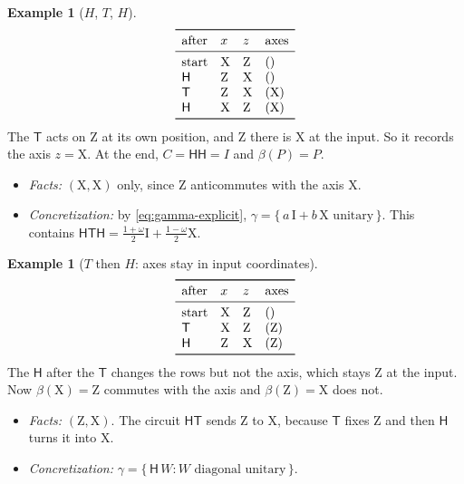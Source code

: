 \documentclass[11pt]{article}
\theoremstyle{definition}
\newtheorem{example}[theorem]{Example}
\theoremstyle{remark}
\newcommand{\gam}{\gamma}
\newcommand{\back}{\beta}
\newcommand{\tI}{\mathrm{I}}
\newcommand{\tX}{\mathrm{X}}
\newcommand{\tZ}{\mathrm{Z}}
\newcommand{\gate}[1]{\mathsf{#1}}
\begin{document}
\begin{example}[$H$, $T$, $H$]
\[
\begin{array}{llll}
\toprule
\text{after} & x & z & \text{axes} \\
\midrule
\text{start} & \tX & \tZ & () \\
\gate H & \tZ & \tX & () \\
\gate T & \tZ & \tX & (\tX) \\
\gate H & \tX & \tZ & (\tX) \\
\bottomrule
\end{array}
\]
The $\gate T$ acts on $\tZ$ at its own position, and $\tZ$ there is $\tX$ at the input. So
it records the axis $z = \tX$. At the end, $C = \gate H\gate H = I$ and $\back(P) = P$.
\begin{itemize}[nosep]
  \item \emph{Facts:} $(\tX, \tX)$ only, since $\tZ$ anticommutes with the axis $\tX$.
  \item \emph{Concretization:} by \eqref{eq:gamma-explicit},
  $\gam = \{\, a\,\tI + b\,\tX \text{ unitary} \,\}$. This contains
  $\gate H\gate T\gate H = \tfrac{1+\omega}{2}\tI + \tfrac{1-\omega}{2}\tX$.
\end{itemize}
\end{example}

\begin{example}[$T$ then $H$: axes stay in input coordinates]
\[
\begin{array}{llll}
\toprule
\text{after} & x & z & \text{axes} \\
\midrule
\text{start} & \tX & \tZ & () \\
\gate T & \tX & \tZ & (\tZ) \\
\gate H & \tZ & \tX & (\tZ) \\
\bottomrule
\end{array}
\]
The $\gate H$ after the $\gate T$ changes the rows but not the axis, which stays $\tZ$ at
the input. Now $\back(\tX) = \tZ$ commutes with the axis and $\back(\tZ) = \tX$ does not.
\begin{itemize}[nosep]
  \item \emph{Facts:} $(\tZ, \tX)$. The circuit $\gate H \gate T$ sends $\tZ$ to $\tX$,
  because $\gate T$ fixes $\tZ$ and then $\gate H$ turns it into $\tX$.
  \item \emph{Concretization:} $\gam = \{\, \gate H\, W : W \text{ diagonal unitary} \,\}$.
\end{itemize}
\end{example}
\end{document}
